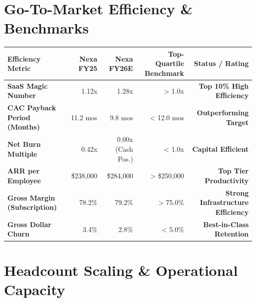 \documentclass[10pt,a4paper]{article}
\begin{document}
\vspace{4pt}

\section{Go-To-Market Efficiency \& Benchmarks}

\noindent
\begin{tcolorbox}[tablebox]
  \small
  \begin{tabularx}{\textwidth}{X r r r r}
    \toprule
    \textbf{Efficiency Metric} & \textbf{Nexa FY25} & \textbf{Nexa FY26E} & \textbf{Top-Quartile Benchmark} & \textbf{Status / Rating} \\
    \midrule
    \textbf{SaaS Magic Number} & 1.12x & 1.28x & > 1.0x & \textcolor{TealSuccess}{\textbf{Top 10\% High Efficiency}} \\
    \textbf{CAC Payback Period (Months)} & 11.2 mos & 9.8 mos & < 12.0 mos & \textcolor{TealSuccess}{\textbf{Outperforming Target}} \\
    \textbf{Net Burn Multiple} & 0.42x & 0.00x (Cash Pos.) & < 1.0x & \textcolor{TealSuccess}{\textbf{Capital Efficient}} \\
    \textbf{ARR per Employee} & \$238,000 & \$284,000 & > \$250,000 & \textcolor{TealSuccess}{\textbf{Top Tier Productivity}} \\
    \textbf{Gross Margin (Subscription)} & 78.2\% & 79.2\% & > 75.0\% & \textcolor{TealSuccess}{\textbf{Strong Infrastructure Efficiency}} \\
    \textbf{Gross Dollar Churn} & 3.4\% & 2.8\% & < 5.0\% & \textcolor{TealSuccess}{\textbf{Best-in-Class Retention}} \\
    \bottomrule
  \end{tabularx}
\end{tcolorbox}

\vfill
\pagebreak


\section{Headcount Scaling \& Operational Capacity}
\end{document}
